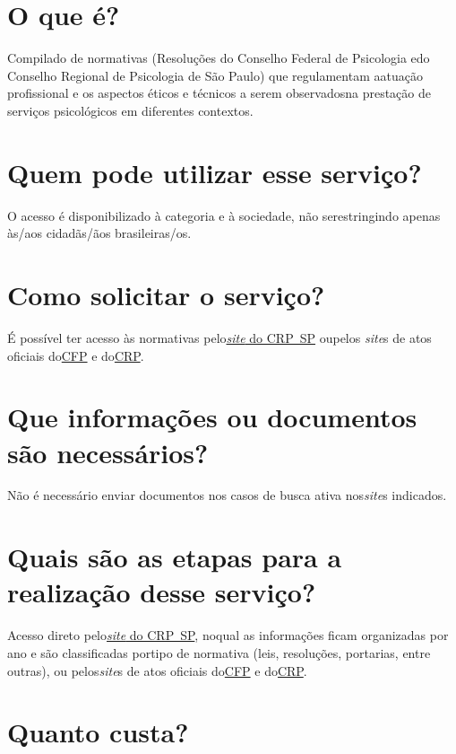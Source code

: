 \section{O que é?}

Compilado de normativas (Resoluções do Conselho Federal de Psicologia edo Conselho Regional de Psicologia de São Paulo) que regulamentam aatuação profissional e os aspectos éticos e técnicos a serem observadosna prestação de serviços psicológicos em diferentes contextos.

\section{Quem pode utilizar esse serviço?}

O acesso é disponibilizado à categoria e à sociedade, não serestringindo apenas às/aos cidadãs/ãos brasileiras/os.

\section{Como solicitar o serviço?}

É possível ter acesso às normativas pelo\href{https://www.crpsp.org/legislacao/index}{\emph{site} do CRP~SP} oupelos \emph{site}s de atos oficiais do\href{https://atosoficiais.com.br/cfp}{CFP} e do\href{https://atosoficiais.com.br/crp06}{CRP}.

\section{Que informações ou documentos são necessários?}

Não é necessário enviar documentos nos casos de busca ativa nos\emph{site}s indicados.

\section{Quais são as etapas para a realização desse serviço?}

Acesso direto pelo\href{https://www.crpsp.org/legislacao/index}{\emph{site} do CRP~SP}, noqual as informações ficam organizadas por ano e são classificadas portipo de normativa (leis, resoluções, portarias, entre outras), ou pelos\emph{site}s de atos oficiais do\href{https://atosoficiais.com.br/cfp}{CFP} e do\href{https://atosoficiais.com.br/crp06}{CRP}.

\section{Quanto custa?}

